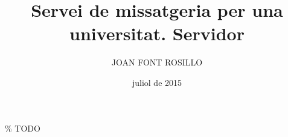 \documentclass[catalan,GINF]{TFGEPSUIB}
\title{Servei de missatgeria per una universitat. Servidor}
\author{\MakeUppercase{Joan Font Rosillo}}
\date{juliol de 2015}
\begin{document}
\portada
\frontmatter

\cleartorecto \thispagestyle{empty}
\begin{agraiments}
\% TODO
\end{agraiments}

\cleartorecto \tableofcontents
\cleartorecto \listoffigures
\cleartorecto \listoftables 

 

 
\mainmatter\pagestyle{ruled}








\appendix 



\backmatter




\end{document}

